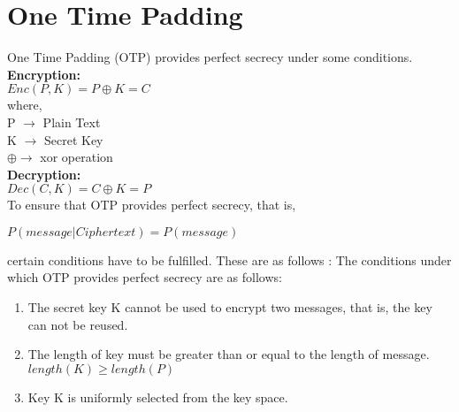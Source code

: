\documentclass[11pt]{article}
\begin{document}
\section{One Time Padding}
One Time Padding (OTP) provides perfect secrecy under some conditions.\\
\textbf{Encryption: }\\
$Enc(P, K) = P \oplus K = C$\\
where,\\
 P $\rightarrow$ Plain Text\\
    K $\rightarrow$ Secret Key\\
    $\oplus \rightarrow $ xor operation\\
\textbf{Decryption: }\\
    $Dec(C, K) = C \oplus K = P$\\
To ensure that OTP provides perfect secrecy, that is,\\
\begin{center}
    $P(message | Cipher text) = P(message)$
\end{center}
certain conditions have to be fulfilled. These are as follows :
The conditions under which OTP provides perfect secrecy are as follows:
\begin{enumerate}
    \item The secret key K cannot be used to encrypt two messages, that is, the key can not be reused.
    \item The length of key must be greater than or equal to the length of message.\\
    $length(K) \geq length(P)$
    \item Key K is uniformly selected from the key space.
\end{enumerate}
\end{document}
